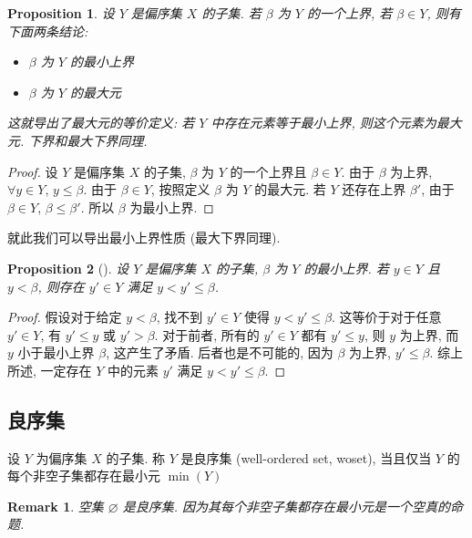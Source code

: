 \documentclass[UTF8]{ctexart}
\theoremstyle{mystyle}
\newtheorem{proposition}{Proposition}[section]
\theoremstyle{myremark}
\newtheorem*{remark}{Remark}
\theoremstyle{plain}
\begin{document}
\begin{proposition}
    设 $ Y $ 是偏序集 $ X $ 的子集. 若 $ \beta $ 为 $ Y $ 的一个上界, 若 $ \beta \in Y $, 则有下面两条结论:
    \begin{itemize}
        \item $ \beta $ 为 $ Y $ 的最小上界
        \item $ \beta $ 为 $ Y $ 的最大元
    \end{itemize}

    这就导出了最大元的等价定义: 若 $ Y $ 中存在元素等于最小上界, 则这个元素为最大元. 下界和最大下界同理.
\end{proposition}

\begin{proof}
    设 $ Y $ 是偏序集 $ X $ 的子集, $ \beta $ 为 $ Y $ 的一个上界且 $ \beta \in Y $. 由于 $ \beta $ 为上界, $ \forall y \in Y $, $ y \le \beta $. 由于 $ \beta \in Y $, 按照定义 $ \beta $ 为 $ Y $ 的最大元. 若 $ Y $ 还存在上界 $ \beta' $, 由于 $ \beta \in Y $, $ \beta \le \beta' $. 所以 $ \beta $ 为最小上界.
\end{proof}

就此我们可以导出最小上界性质 (最大下界同理).

\begin{proposition}[]
    设 $ Y $ 是偏序集 $ X $ 的子集, $ \beta $ 为 $ Y $ 的最小上界. 若 $ y \in Y $ 且 $ y < \beta $, 则存在 $ y' \in Y $ 满足 $ y < y' \le \beta $.
\end{proposition}

\begin{proof}
    假设对于给定 $ y < \beta $, 找不到 $ y' \in Y $ 使得 $ y < y' \le \beta $. 这等价于对于任意 $ y' \in Y $, 有 $ y' \le y $ 或 $ y' > \beta $. 对于前者, 所有的 $ y' \in Y $ 都有 $ y' \le y $, 则 $ y $ 为上界, 而 $ y $ 小于最小上界 $ \beta $, 这产生了矛盾. 后者也是不可能的, 因为 $ \beta $ 为上界, $ y' \le \beta $. 综上所述, 一定存在 $ Y $ 中的元素 $ y' $ 满足 $ y < y' \le \beta $.
\end{proof}


\subsection{良序集}
\begin{definition}
    设 $ Y $ 为偏序集 $ X $ 的子集. 称 $ Y $ 是良序集 (well-ordered set, woset), 当且仅当 $ Y $ 的每个非空子集都存在最小元 $ \min(Y) $
\end{definition}

\begin{remark}
    空集 $ \varnothing $ 是良序集. 因为其每个非空子集都存在最小元是一个空真的命题.
\end{remark}
\end{document}
